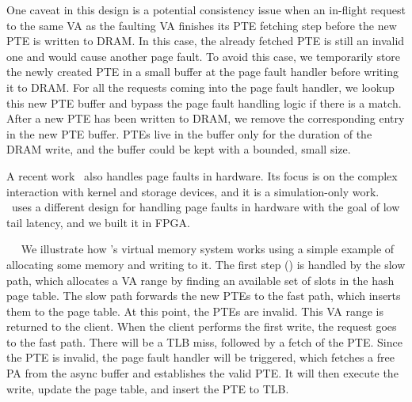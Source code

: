 One caveat in this design is a potential consistency issue
when an in-flight request to the same VA as the faulting VA 
finishes its PTE fetching step before the new PTE is written to DRAM.
In this case, the already fetched PTE is still an invalid one and would cause another page fault.
To avoid this case, %
we temporarily store the newly created PTE in a small buffer at the page fault handler before writing it to DRAM.
For all the requests coming into the page fault handler, we lookup this new PTE buffer 
and bypass the page fault handling logic if there is a match.
After a new PTE has been written to DRAM, we remove the corresponding entry in the new PTE buffer.
PTEs live in the buffer only for the duration of the DRAM write, and the buffer could be kept with a bounded, small size.
\fi

A recent work~\cite{lee-isca20} also handles page faults in hardware. 
Its focus is on the complex interaction with kernel and storage devices, and it is a simulation-only work. \sys\ uses a different design for handling page faults in hardware with the goal of low tail latency, and we built it in FPGA.

~~
We illustrate how \sysboard{}'s virtual memory system works using a simple example of allocating some memory and writing to it.
The first step (\alloc) is handled by the slow path, which allocates a VA range by finding an available set of slots in the hash page table.
The slow path forwards the new PTEs to the fast path, which inserts them to the page table.
At this point, the PTEs are invalid.
This VA range is returned to the client.
When the client performs the first write, the request goes to the fast path.
There will be a TLB miss, followed by a fetch of the PTE.
Since the PTE is invalid, the page fault handler will be triggered,
which fetches a free PA from the async buffer and establishes the valid PTE.
It will then execute the write, update the page table, and insert the PTE to TLB.

